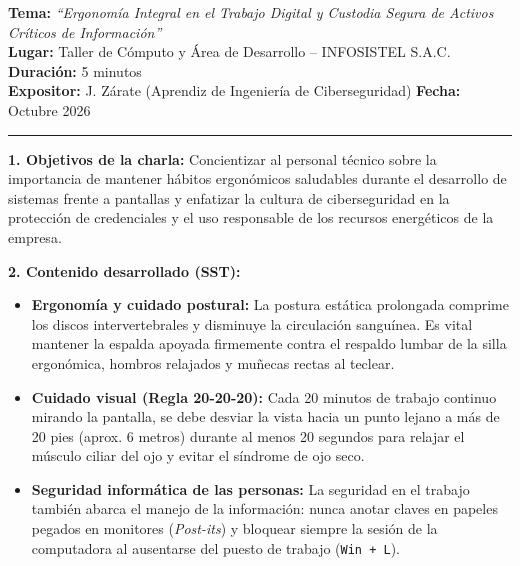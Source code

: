 \documentclass[11pt,a4paper]{article}
\begin{document}
\begin{tcolorbox}[colback=lightgray,colframe=senatiblue,arc=2mm,title=\textbf{REGISTRO DE CHARLA DE CINCO MINUTOS -- SST / SGA}]
\textbf{Tema:} \textit{``Ergonomía Integral en el Trabajo Digital y Custodia Segura de Activos Críticos de Información''} \\
\textbf{Lugar:} Taller de Cómputo y Área de Desarrollo -- INFOSISTEL S.A.C. \hfill \textbf{Duración:} 5 minutos \\
\textbf{Expositor:} J. Zárate (Aprendiz de Ingeniería de Ciberseguridad) \hfill \textbf{Fecha:} Octubre 2026

\vspace{6pt}
\hrule
\vspace{6pt}

\textbf{1. Objetivos de la charla:}
Concientizar al personal técnico sobre la importancia de mantener hábitos ergonómicos saludables durante el desarrollo de sistemas frente a pantallas y enfatizar la cultura de ciberseguridad en la protección de credenciales y el uso responsable de los recursos energéticos de la empresa.

\vspace{4pt}
\textbf{2. Contenido desarrollado (SST):}
\begin{itemize}
    \item \textbf{Ergonomía y cuidado postural:} La postura estática prolongada comprime los discos intervertebrales y disminuye la circulación sanguínea. Es vital mantener la espalda apoyada firmemente contra el respaldo lumbar de la silla ergonómica, hombros relajados y muñecas rectas al teclear.
    \item \textbf{Cuidado visual (Regla 20-20-20):} Cada 20 minutos de trabajo continuo mirando la pantalla, se debe desviar la vista hacia un punto lejano a más de 20 pies (aprox. 6 metros) durante al menos 20 segundos para relajar el músculo ciliar del ojo y evitar el síndrome de ojo seco.
    \item \textbf{Seguridad informática de las personas:} La seguridad en el trabajo también abarca el manejo de la información: nunca anotar claves en papeles pegados en monitores (\textit{Post-its}) y bloquear siempre la sesión de la computadora al ausentarse del puesto de trabajo (\texttt{Win + L}).
\end{itemize}


\end{tcolorbox}
\end{document}
